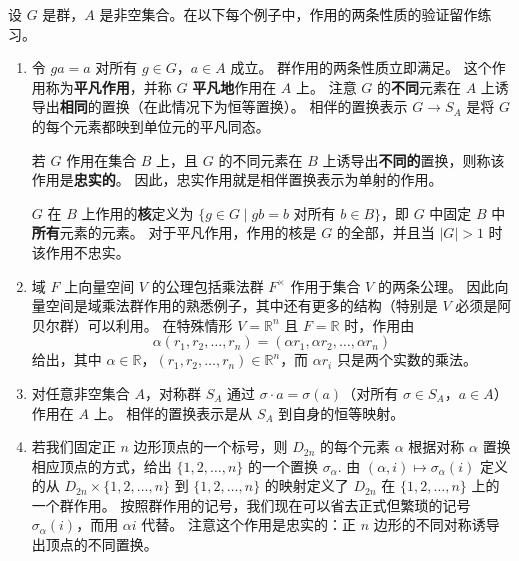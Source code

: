 \begin{example}
设 \( G \) 是群，\( A \) 是非空集合。在以下每个例子中，作用的两条性质的验证留作练习。
\begin{enumerate}[label=(\arabic*)]
\item 令 \( ga = a \) 对所有 \( g \in G \)，\( a \in A \) 成立。
群作用的两条性质立即满足。
这个作用称为\textbf{平凡作用}，并称 \( G \) \textbf{平凡地}作用在 \( A \) 上。
注意 \( G \) 的\textbf{不同}元素在 \( A \) 上诱导出\textbf{相同}的置换（在此情况下为恒等置换）。
相伴的置换表示 \( G \to S_A \) 是将 \( G \) 的每个元素都映到单位元的平凡同态。

若 \( G \) 作用在集合 \( B \) 上，且 \( G \) 的不同元素在 \( B \) 上诱导出\textbf{不同的}置换，则称该作用是\textbf{忠实的}。
因此，忠实作用就是相伴置换表示为单射的作用。

\( G \) 在 \( B \) 上作用的\textbf{核}定义为 \( \{g \in G \mid gb = b \text{ 对所有 } b \in B\} \)，即 \( G \) 中固定 \( B \) 中\textbf{所有}元素的元素。
对于平凡作用，作用的核是 \( G \) 的全部，并且当 \( |G| > 1 \) 时该作用不忠实。

\item 域 \( F \) 上向量空间 \( V \) 的公理包括乘法群 \( F^\times \) 作用于集合 \( V \) 的两条公理。
因此向量空间是域乘法群作用的熟悉例子，其中还有更多的结构（特别是 \( V \) 必须是阿贝尔群）可以利用。
在特殊情形 \( V = \mathbb{R}^n \) 且 \( F = \mathbb{R} \) 时，作用由
\[
\alpha(r_1, r_2, \ldots, r_n) = (\alpha r_1, \alpha r_2, \ldots, \alpha r_n)
\]
给出，其中 \( \alpha \in \mathbb{R} \)，\( (r_1, r_2, \ldots, r_n) \in \mathbb{R}^n \)，而 \( \alpha r_i \) 只是两个实数的乘法。

\item 对任意非空集合 \( A \)，对称群 \( S_A \) 通过 \( \sigma \cdot a = \sigma(a) \)（对所有 \( \sigma \in S_A \)，\( a \in A \)）作用在 \( A \) 上。
相伴的置换表示是从 \( S_A \) 到自身的恒等映射。

\item 若我们固定正 \( n \) 边形顶点的一个标号，则 \( D_{2n} \) 的每个元素 \( \alpha \) 根据对称 \( \alpha \) 置换相应顶点的方式，给出 \( \{1, 2, \ldots, n\} \) 的一个置换 \( \sigma_\alpha \). 
由 \( (\alpha, i) \mapsto \sigma_\alpha(i) \) 定义的从 \( D_{2n} \times \{1, 2, \ldots, n\} \) 到 \( \{1, 2, \ldots, n\} \) 的映射定义了 \( D_{2n} \) 在 \( \{1, 2, \ldots, n\} \) 上的一个群作用。
按照群作用的记号，我们现在可以省去正式但繁琐的记号 \( \sigma_\alpha(i) \)，而用 \( \alpha i \) 代替。
注意这个作用是忠实的：正 \( n \) 边形的不同对称诱导出顶点的不同置换。


\end{enumerate}
\end{example}
